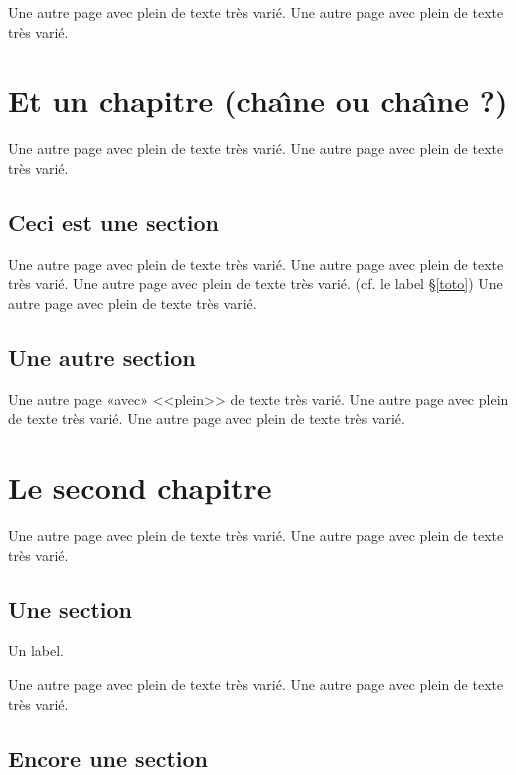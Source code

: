 \documentclass[11pt]{thesul}
\begin{document}
Une autre page avec plein de texte très varié.
Une autre page avec plein de texte très varié.

\DontFrameThisInToc
\chapter{Et un chapitre (cha\^{\i}ne ou cha\^\i ne ?)}
\minitoc

Une autre page avec plein de texte très varié.
Une autre page avec plein de texte très varié.

\section{Ceci est une section}

Une autre page avec plein de texte très varié.
Une autre page avec plein de texte très varié.
Une autre page avec plein de texte très varié.
(cf. le label \S\ref{toto})
Une autre page avec plein de texte très varié.

\section{Une autre section}

Une autre page «avec» <<plein>> de texte très varié.
Une autre page avec plein de texte très varié.
Une autre page avec plein de texte très varié.

%
\PutLineInToc
\PutNewPageInToc

\WriteThisInToc
\chapter{Le second chapitre}
\minitoc

Une autre page avec plein de texte très varié.
Une autre page avec plein de texte très varié.

\section{Une section}

Un label.\label{toto}


Une autre page avec plein de texte très varié.
Une autre page avec plein de texte très varié.

\section{Encore une section}
\end{document}
